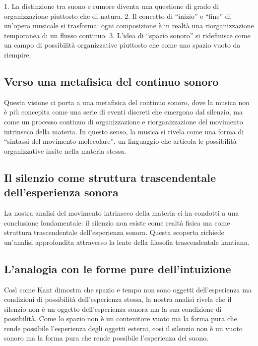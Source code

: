 \documentclass{gs-adonis}
\begin{document}
1. La distinzione tra suono e rumore diventa una questione di grado di
organizzazione piuttosto che di natura. 2. Il concetto di ``inizio'' e
``fine'' di un'opera musicale si trasforma: ogni composizione è in
realtà una riorganizzazione temporanea di un flusso continuo. 3. L'idea
di ``spazio sonoro'' si ridefinisce come un campo di possibilità
organizzative piuttosto che come uno spazio vuoto da riempire.

\subsection{Verso una metafisica del continuo
sonoro}\label{verso-una-metafisica-del-continuo-sonoro}

Questa visione ci porta a una metafisica del continuo sonoro, dove la
musica non è più concepita come una serie di eventi discreti che
emergono dal silenzio, ma come un processo continuo di organizzazione e
riorganizzazione del movimento intrinseco della materia. In questo
senso, la musica si rivela come una forma di ``sintassi del movimento
molecolare'', un linguaggio che articola le possibilità organizzative
insite nella materia stessa.

\subsection{Il silenzio come struttura trascendentale dell'esperienza
sonora}\label{il-silenzio-come-struttura-trascendentale-dellesperienza-sonora}

La nostra analisi del movimento intrinseco della materia ci ha condotti
a una conclusione fondamentale: il silenzio non esiste come realtà
fisica ma come struttura trascendentale dell'esperienza sonora. Questa
scoperta richiede un'analisi approfondita attraverso la lente della
filosofia trascendentale kantiana.

\subsection{L'analogia con le forme pure
dell'intuizione}\label{lanalogia-con-le-forme-pure-dellintuizione}

Così come Kant dimostra che spazio e tempo non sono oggetti
dell'esperienza ma condizioni di possibilità dell'esperienza stessa, la
nostra analisi rivela che il silenzio non è un oggetto dell'esperienza
sonora ma la sua condizione di possibilità. Come lo spazio non è un
contenitore vuoto ma la forma pura che rende possibile l'esperienza
degli oggetti esterni, così il silenzio non è un vuoto sonoro ma la
forma pura che rende possibile l'esperienza del suono.
\end{document}
